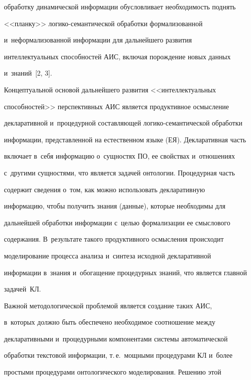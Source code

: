 обработку динамической информации обусловливает необходимость поднять 


<<планку>> ло\-ги\-ко-се\-ман\-ти\-че\-ской обработки формализованной 


и~неформализованной информации для дальнейшего развития 


интеллектуальных способностей АИС, включая порождение новых данных 


и~знаний~[2, 3].


  


  Концептуальной основой дальнейшего развития <<интеллектуальных 


способностей>> перспективных АИС является продуктивное осмысление 


декларативной и~процедурной составляющей логико-семантической обработки 


информации, представленной на естественном языке (ЕЯ). Декларативная часть 


включает в~себя информацию о~сущностях ПО, ее свойствах и~отношениях 


с~другими сущностями, что является задачей онтологии. Процедурная часть 


содержит сведения о~том, как можно использовать декларативную 


информацию, чтобы получить знания (данные), которые необходимы для 


дальнейшей обработки информации с~целью формализации ее смыслового 


содержания. В~результате такого продуктивного осмысления происходит 


моделирование процесса анализа и~синтеза исходной декларативной 


информации в~знания и~обогащение процедурных знаний, что является главной 


задачей~КЛ.


  


  Важной методологической проблемой является создание таких АИС, 


в~которых должно быть обеспечено необходимое соотношение между 


декларативными и~процедурными компонентами системы автоматической 


обработки текстовой информации, т.\,е.\ мощными процедурами КЛ и~более 


простыми процедурами онтологического моделирования. Решению этой 


